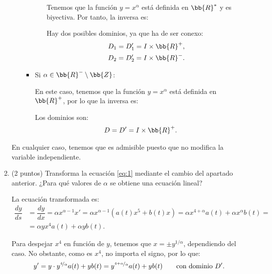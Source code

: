 \documentclass[12pt]{article}
\begin{document}
\begin{ejercicio}[6 puntos]
\begin{enumerate}
\begin{itemize}
\begin{itemize}
\begin{itemize}
                    Tenemos que la función $y=x^\alpha$ está definida en $\bb{R}^\ast$ y es biyectiva.
                    Por tanto, la inversa es:

                    Hay dos posibles dominios, ya que ha de ser conexo:
                    \begin{align*}
                        D_1=D_1'=I \times \bb{R}^+,\\
                        D_2=D_2'=I \times \bb{R}^-.
                    \end{align*}
                \end{itemize}

                \item Si $\alpha\in \bb{R}^-\setminus \bb{Z}$:
                
                En este caso, tenemos que la función $y=x^\alpha$ está definida en $\bb{R}^+$, por lo que la inversa es:

                Los dominios son:
                \begin{align*}
                    D=D'=I \times \bb{R}^+.
                \end{align*}
            \end{itemize}
        \end{itemize}

        En cualquier caso, tenemos que es admisible puesto que no modifica la variable independiente.

        \item (2 puntos) Transforma la ecuación \eqref{eq:1} mediante el cambio del apartado anterior. ¿Para qué valores de $\alpha$ se obtiene una ecuación lineal?
        
        La ecuación transformada es:
        \begin{align*}
            \dfrac{dy}{ds}&=\dfrac{dy}{dx} = \alpha x^{\alpha-1}x' = \alpha x^{\alpha-1}\left(a(t)x^5+b(t)x\right) = \alpha x^{4+\alpha}a(t)+\alpha x^{\alpha}b(t)=\\
            &=\alpha yx^4a(t)+\alpha yb(t).
        \end{align*}

        Para despejar $x^4$ en función de $y$, tenemos que $x=\pm y^{1/\alpha}$, dependiendo del caso. No obstante, como es $x^4$, no importa el signo, por lo que:
        \begin{equation*}
            y'=y\cdot y^{\nicefrac{4}{\alpha}}a(t)+yb(t)=y^{\nicefrac{4+\alpha}{\alpha}}a(t)+yb(t)\qquad \text{con dominio }D'.
        \end{equation*}


\end{enumerate}
\end{ejercicio}
\end{document}
